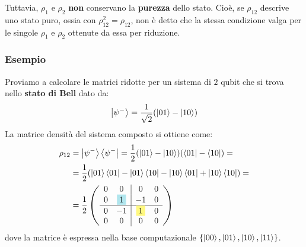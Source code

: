\documentclass[../../InformazioneQuantistica.tex]{subfiles}
\begin{document}
Tuttavia, $\rho_1$ e $\rho_2$ \textbf{non} conservano la \textbf{purezza} dello stato. Cioè, se $\rho_{12}$ descrive uno stato puro, ossia con $\rho_{12}^2 = \rho_{12}$, non è detto che la stessa condizione valga per le singole $\rho_1$ e $\rho_2$ ottenute da essa per riduzione.

\subsubsection{Esempio}
Proviamo a calcolare le matrici ridotte per un sistema di $2$ qubit che si trova nello \textbf{stato di Bell} dato da:
\begin{align*}
\Ket{\psi^-}= \frac{1}{\sqrt{2}} (\Ket{01}-\Ket{10})
\end{align*}
La matrice densità del sistema composto si ottiene come:
\begin{align} \nonumber
\rho_{12} &= \ket{\psi^-}\bra{\psi^-} = \frac{1}{2}(\ket{01}-\ket{10})(\bra{01}-\bra{10}) = \\
&= \frac{1}{2}(\ket{01}\bra{01} -\ket{01}\bra{10}-\ket{10}\bra{01}+\ket{10}\bra{10})= \label{eqn:rho-matrix-es1}\\
&= \frac{1}{2}\left(\begin{array}{cc|cc}
0 & 0 & 0 & 0\\
0 & \hlc{SkyBlue}{1} & -1 & 0\\ \hline
0 & -1 & \hlc{Yellow}{1} & 0\\
0 & 0 & 0 & 0
\end{array}\right) \nonumber
\end{align}
dove la matrice è espressa nella base computazionale $\{\Ket{00}, \Ket{01}, \Ket{10}, \Ket{11}\}$.\\
\end{document}
